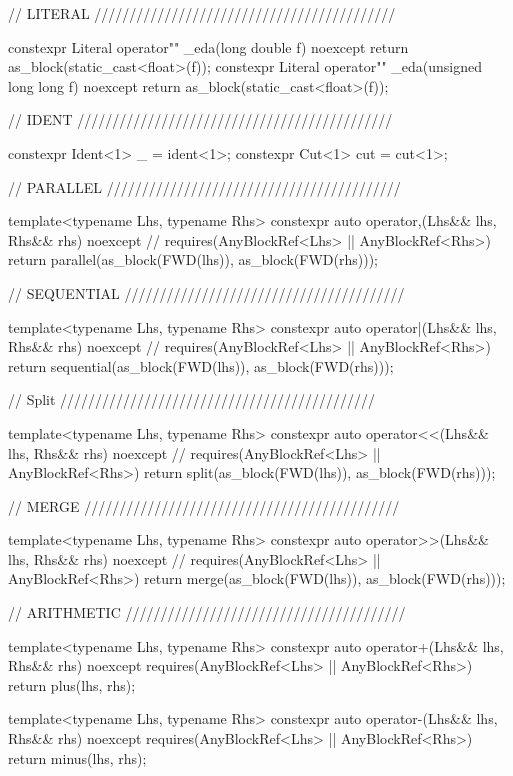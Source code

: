 \begin{cppcodenl}
  // LITERAL ///////////////////////////////////////////

  constexpr Literal operator"" _eda(long double f) noexcept
  {
    return as_block(static_cast<float>(f));
  }
  constexpr Literal operator"" _eda(unsigned long long f) noexcept
  {
    return as_block(static_cast<float>(f));
  }

  // IDENT /////////////////////////////////////////////

  constexpr Ident<1> _ = ident<1>;
  constexpr Cut<1> cut = cut<1>;

  // PARALLEL //////////////////////////////////////////

  template<typename Lhs, typename Rhs>
  constexpr auto operator,(Lhs&& lhs, Rhs&& rhs) noexcept //
    requires(AnyBlockRef<Lhs> || AnyBlockRef<Rhs>)
  {
    return parallel(as_block(FWD(lhs)), as_block(FWD(rhs)));
  }

  // SEQUENTIAL ////////////////////////////////////////

  template<typename Lhs, typename Rhs>
  constexpr auto operator|(Lhs&& lhs, Rhs&& rhs) noexcept //
    requires(AnyBlockRef<Lhs> || AnyBlockRef<Rhs>)
  {
    return sequential(as_block(FWD(lhs)), as_block(FWD(rhs)));
  }

  // Split /////////////////////////////////////////////

  template<typename Lhs, typename Rhs>
  constexpr auto operator<<(Lhs&& lhs, Rhs&& rhs) noexcept //
    requires(AnyBlockRef<Lhs> || AnyBlockRef<Rhs>)
  {
    return split(as_block(FWD(lhs)), as_block(FWD(rhs)));
  }

  // MERGE /////////////////////////////////////////////

  template<typename Lhs, typename Rhs>
  constexpr auto operator>>(Lhs&& lhs, Rhs&& rhs) noexcept //
    requires(AnyBlockRef<Lhs> || AnyBlockRef<Rhs>)
  {
    return merge(as_block(FWD(lhs)), as_block(FWD(rhs)));
  }

  // ARITHMETIC ////////////////////////////////////////

  template<typename Lhs, typename Rhs>
  constexpr auto operator+(Lhs&& lhs, Rhs&& rhs) noexcept requires(AnyBlockRef<Lhs> || AnyBlockRef<Rhs>)
  {
    return plus(lhs, rhs);
  }

  template<typename Lhs, typename Rhs>
  constexpr auto operator-(Lhs&& lhs, Rhs&& rhs) noexcept requires(AnyBlockRef<Lhs> || AnyBlockRef<Rhs>)
  {
    return minus(lhs, rhs);
  }


\end{cppcodenl}
